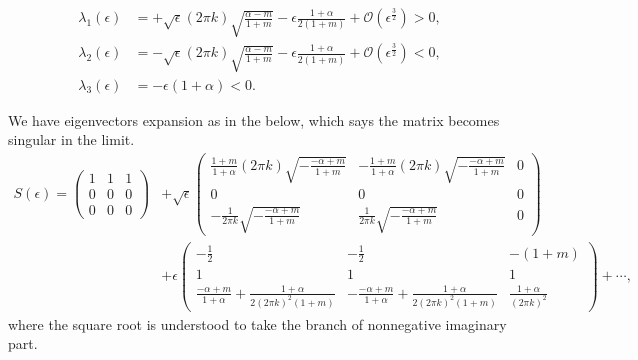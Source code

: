 \documentclass[a4paper,11pt]{article}
\newtheorem{proposition}{Proposition}[section]
\theoremstyle{remark}
\begin{document}
\begin{align*}
 \lambda_1(\epsilon) &= +\sqrt{\epsilon} (2\pi k)\sqrt{\frac{\alpha-m}{1+m}} - \epsilon\frac{1+\alpha}{2(1+m)} + \mathcal{O}(\epsilon^{\frac{3}{2}}) > 0,\\
 \lambda_2(\epsilon) &= -\sqrt{\epsilon} (2\pi k)\sqrt{\frac{\alpha-m}{1+m}} - \epsilon\frac{1+\alpha}{2(1+m)} + \mathcal{O}(\epsilon^{\frac{3}{2}}) < 0,\\
 \lambda_3(\epsilon) &= -\epsilon(1+\alpha)<0.
\end{align*}
%
%

We have eigenvectors expansion as in the below, which says the matrix becomes singular in the limit.
\begin{align*}
 S(\epsilon) =
 \begin{pmatrix}
  1 & 1 & 1 \\
  0 & 0 & 0 \\
  0 & 0 & 0
 \end{pmatrix}
 &+\sqrt\epsilon  \begin{pmatrix}
  \frac{1+m}{1+\alpha}(2\pi k) \sqrt{-\frac{-\alpha+m}{1+m}} & -\frac{1+m}{1+\alpha}(2\pi k) \sqrt{-\frac{-\alpha+m}{1+m}} & 0 \\
  0 & 0 & 0 \\
  -\frac{1}{2\pi k}\sqrt{-\frac{-\alpha+m}{1+m}} & \frac{1}{2\pi k}\sqrt{-\frac{-\alpha+m}{1+m}} & 0
 \end{pmatrix}\\
 &+\epsilon\begin{pmatrix}
  - \frac{1}{2} & - \frac{1}{2} & -(1+m) \\
  1 & 1 & 1 \\
  \frac{-\alpha+m}{1+\alpha}+\frac{1+\alpha}{2(2\pi k)^2(1+m)}  & -\frac{-\alpha+m}{1+\alpha} +\frac{1+\alpha}{2(2\pi k)^2(1+m)} & \frac{1+\alpha}{(2\pi k)^2}
 \end{pmatrix}
 + \cdots,
\end{align*}
where the square root is understood to take the branch of nonnegative imaginary part.
\end{document}
